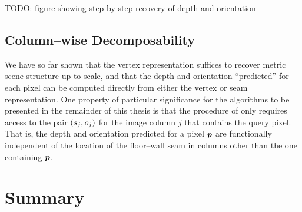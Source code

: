 TODO: figure showing step-by-step recovery of depth and orientation

\subsection{Column--wise Decomposability}
\label{sec:col-decomposability}

We have so far shown that the vertex representation suffices to
recover metric scene structure up to scale, and that the depth and
orientation ``predicted'' for each pixel can be computed directly from
either the vertex or seam representation. One property of particular
significance for the algorithms to be presented in the remainder of
this thesis is that the procedure of  only
requires access to the pair $(\seam_j,\WallOrient_j)$ for the image
column $j$ that contains the query pixel. That is, the depth and
orientation predicted for a pixel $\Pixel$ are functionally
independent of the location of the floor--wall seam in columns other
than the one containing $\Pixel$.

\section{Summary}
